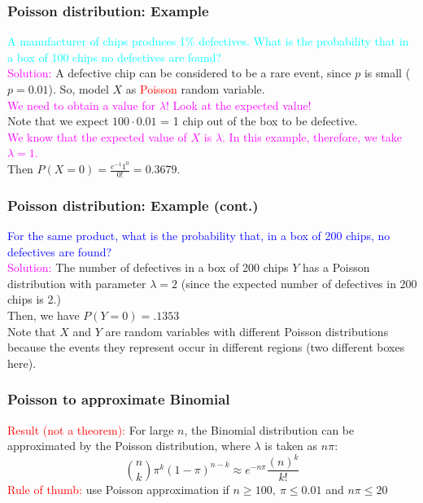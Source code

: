 \documentclass[xcolor=dvipsnames,12pt]{beamer}
\begin{document}
\begin{frame}
\frametitle{Poisson distribution: Example }
{\textcolor{cyan}{ A manufacturer of chips produces 1\%  defectives.
What is the probability that in a box of 100 chips no defectives are found?}}\\[.01in] 
 {\textcolor{magenta}{Solution:}} A defective chip can be
considered to be a rare event, since $p$ is small ($p = 0.01$). So, model $X$ as {\textcolor{red}{Poisson}} random variable.\\[.01in] 
{\textcolor{magenta}{ We need to obtain a value for $\lambda$! Look at the expected value!}}\\[.01in]
 Note that we expect $100 \cdot 0.01$ = 1 chip out of the box to be defective.\\[.01in] 
 {\textcolor{magenta}{ We know that the expected value of $X$ is $\lambda$. In this example, therefore, we take $\lambda = 1$.}}\\[.01in] 
Then $P(X=0) = \frac{e^{-1}1^{0}}{0!} = 0.3679.$  
\end{frame}
 


\begin{frame}
\frametitle{Poisson distribution: Example (cont.) }
{\textcolor{blue}{ For the same product, what is the probability that, in a box of 200 chips, no defectives are found?}}\\
{\textcolor{magenta}{Solution:}} The number of defectives in a box of 200 chips $Y$ has a Poisson distribution with parameter $\lambda=2$ (since the expected number of defectives in 200 chips is 2.)\\
 Then, we have $P(Y=0)= .1353$ \\
 Note that $X$ and $Y$ are random variables with different Poisson distributions because the events they represent occur in different regions (two different boxes here).\\
\end{frame}


\begin{frame}
\frametitle{Poisson to approximate Binomial}
 {\textcolor{red}{Result (not a theorem):}} For large $n$, the Binomial distribution can be  approximated by the
Poisson distribution, where $\lambda$ is taken as $n\pi$:
$$
{n \choose k} \pi^{k}(1-\pi)^{n-k} \approx e^{-n\pi}\frac{(n)^{k}}{k!}
$$
 {\textcolor{red}{Rule of thumb:}} use Poisson approximation if $n \ge 100,\ \pi \le 0.01$ and $n\pi \leq 20$\\[.2in] 

\end{frame}
\end{document}
